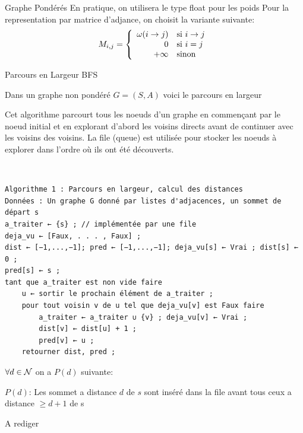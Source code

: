 \documentclass[a4paper,french,bookmarks]{article}
\begin{document}
    \begin{definition}{Graphe Pondérés}{}
        En pratique, on utilisera le type float pour les poids
        Pour la representation par matrice d'adjance, on choisit la variante suivante:
        \[ M_{i,j} = \left\lbrace\begin{array}{rl}
            \omega\!\left(i \to j\right) &\text{si } i \to j \\
            0 &\text{si } i = j\\
            +\infty &\text{sinon}
        \end{array}\right. \]
    
    \end{definition}


    \begin{definition}{Parcours en Largeur BFS}{}
    
        Dans un graphe non pondéré $G = (S,A)$ voici le parcours en largeur 
        
        Cet algorithme parcourt tous les noeuds d'un graphe en commençant par le noeud initial et en explorant d'abord les voisins directs avant de continuer avec les voisins des voisins. La file (queue) est utilisée pour stocker les noeuds à explorer dans l'ordre où ils ont été découverts.
        
        \\
        
        
        
        \begin{lstlisting}
Algorithme 1 : Parcours en largeur, calcul des distances
Données : Un graphe G donné par listes d'adjacences, un sommet de départ s
a_traiter ← {s} ; // implémentée par une file
deja_vu ← [Faux, . . . , Faux] ;
dist ← [−1,...,−1]; pred ← [−1,...,−1]; deja_vu[s] ← Vrai ; dist[s] ← 0 ;
pred[s] ← s ;
tant que a_traiter est non vide faire
    u ← sortir le prochain élément de a_traiter ;
    pour tout voisin v de u tel que deja_vu[v] est Faux faire
        a_traiter ← a_traiter ∪ {v} ; deja_vu[v] ← Vrai ;
        dist[v] ← dist[u] + 1 ;
        pred[v] ← u ;
    retourner dist, pred ;
        \end{lstlisting}
        
        


    \end{definition}



    
    \begin{lemma}{}{}
        $\forall d \in \mathcal{N}$ on a $ P(d)$ suivante:
        
        $P(d) $: Les sommet a distance $d$ de $s$ sont inséré dans la file avant tous ceux a distance
        $\geqslant d+1 $ de s 
    \end{lemma}
    \begin{nproof}{}{}
        A rediger
        
    \end{nproof}
    
\end{document}
